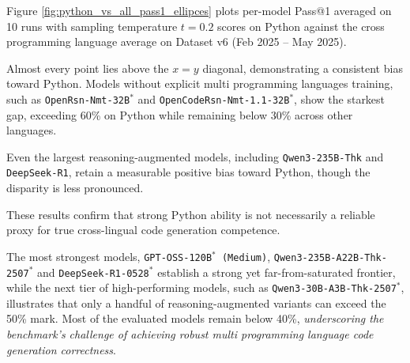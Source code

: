 \documentclass{llmxive}
\begin{document}
Figure \ref{fig:python_vs_all_pass1_ellipces} plots per-model Pass@1 averaged on 10 runs with sampling temperature $t = 0.2$ scores on Python against the cross programming language average on Dataset v6 (Feb 2025 -- May 2025). 


 Almost every point lies above the $x=y$ diagonal, demonstrating a consistent bias toward Python. Models without explicit multi programming languages training, such as \texttt{OpenRsn-Nmt-32B$^{*}$} and \texttt{OpenCodeRsn-Nmt-1.1-32B$^{*}$}, show the starkest gap, exceeding 60\% on Python while remaining below 30\% across other languages. 


Even the largest reasoning-augmented models, including \texttt{Qwen3-235B-Thk} and \texttt{DeepSeek-R1}, retain a measurable positive bias toward Python, though the disparity is less pronounced. %

These results confirm that strong Python ability is not necessarily a reliable proxy for true cross-lingual code generation competence.


 The most strongest models, \texttt{GPT-OSS-120B$^{*}$ (Medium)}, \texttt{Qwen3-235B-A22B-Thk-2507$^{*}$} and \texttt{DeepSeek-R1-0528$^{*}$} establish a strong yet far-from-saturated frontier, while the next tier of high-performing models, such as \texttt{Qwen3-30B-A3B-Thk-2507$^{*}$}, illustrates that only a handful of reasoning-augmented variants can exceed the 50\% mark. Most of the evaluated models remain below 40\%, \textit{underscoring the benchmark’s  challenge of achieving robust multi programming language code generation correctness}.




\end{document}
